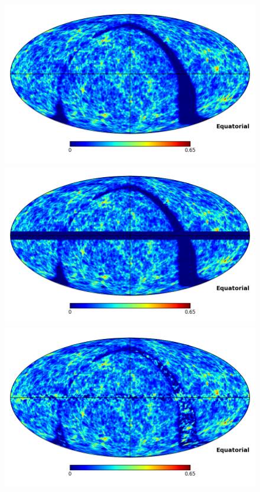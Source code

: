 \documentclass[useAMS,usenatbib]{mn2e}
\begin{document}
\begin{figure}
  \includegraphics[width=\columnwidth,clip,trim=0 1in 0 0]{infill_test_dataC.png}
  \includegraphics[width=\columnwidth,clip,trim=0 1in 0 0]{infill_test_maskeddataC.png}
  \includegraphics[width=\columnwidth,clip,trim=0 1in 0 0]{infill_test_resultC.png}

\end{figure}
\end{document}

